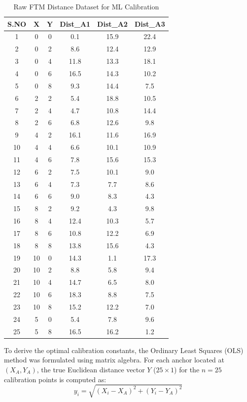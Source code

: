 \documentclass[conference]{IEEEtran}
\begin{document}
\begin{table}[htbp]
\centering
\caption{Raw FTM Distance Dataset for ML Calibration}
\label{tab:calibration_data}
\begin{tabular}{|c|c|c|c|c|c|}
\hline
\textbf{S.NO} & \textbf{X} & \textbf{Y} & \textbf{Dist\_A1} & \textbf{Dist\_A2} & \textbf{Dist\_A3} \\
\hline
1 & 0 & 0 & 0.1 & 15.9 & 22.4 \\
\hline
2 & 0 & 2 & 8.6 & 12.4 & 12.9 \\
\hline
3 & 0 & 4 & 11.8 & 13.3 & 18.1 \\
\hline
4 & 0 & 6 & 16.5 & 14.3 & 10.2 \\
\hline
5 & 0 & 8 & 9.3 & 14.4 & 7.5 \\
\hline
6 & 2 & 2 & 5.4 & 18.8 & 10.5 \\
\hline
7 & 2 & 4 & 4.7 & 10.8 & 14.4 \\
\hline
8 & 2 & 6 & 6.8 & 12.6 & 9.8 \\
\hline
9 & 4 & 2 & 16.1 & 11.6 & 16.9 \\
\hline
10 & 4 & 4 & 6.6 & 10.1 & 10.9 \\
\hline
11 & 4 & 6 & 7.8 & 15.6 & 15.3 \\
\hline
12 & 6 & 2 & 7.5 & 10.1 & 9.0 \\
\hline
13 & 6 & 4 & 7.3 & 7.7 & 8.6 \\
\hline
14 & 6 & 6 & 9.0 & 8.3 & 4.3 \\
\hline
15 & 8 & 2 & 9.2 & 4.3 & 9.8 \\
\hline
16 & 8 & 4 & 12.4 & 10.3 & 5.7 \\
\hline
17 & 8 & 6 & 10.8 & 12.2 & 6.9 \\
\hline
18 & 8 & 8 & 13.8 & 15.6 & 4.3 \\
\hline
19 & 10 & 0 & 14.3 & 1.1 & 17.3 \\
\hline
20 & 10 & 2 & 8.8 & 5.8 & 9.4 \\
\hline
21 & 10 & 4 & 14.7 & 6.5 & 8.0 \\
\hline
22 & 10 & 6 & 18.3 & 8.8 & 7.5 \\
\hline
23 & 10 & 8 & 15.2 & 12.2 & 7.0 \\
\hline
24 & 5 & 0 & 5.4 & 7.8 & 9.6 \\
\hline
25 & 5 & 8 & 16.5 & 16.2 & 1.2 \\
\hline
\end{tabular}
\end{table}

To derive the optimal calibration constants, the Ordinary Least Squares (OLS) method was formulated using matrix algebra. For each anchor located at $(X_A, Y_A)$, the true Euclidean distance vector $Y$ ($25 \times 1$) for the $n=25$ calibration points is computed as:
$$y_i = \sqrt{(X_i - X_A)^2 + (Y_i - Y_A)^2}$$
\end{document}

